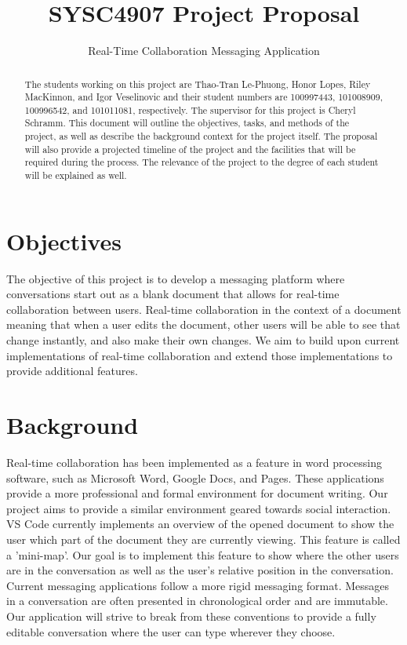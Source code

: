 \documentclass[letterpaper,12pt]{report}
\begin{document}
	\title{SYSC4907 Project Proposal}
	\author{Real-Time Collaboration Messaging Application}
	\date{}
	\maketitle

	\begin{abstract}
		The students working on this project are Thao-Tran Le-Phuong, Honor
		Lopes, Riley MacKinnon, and Igor Veselinovic and their student numbers
		are 100997443, 101008909, 100996542, and 101011081, respectively. The
		supervisor for this project is Cheryl Schramm. This document will
		outline the objectives, tasks, and methods of the project, as well as
		describe the background context for the project itself. The proposal
		will also provide a projected timeline of the project and the
		facilities that will be required during the process. The relevance of
		the project to the degree of each student will be explained as well.
	\end{abstract}

	\tableofcontents

	\pagebreak

	\section*{Objectives}
	\markright{}
	The objective of this project is to develop a messaging platform where
	conversations start out as a blank document that allows for real-time
	collaboration between users. Real-time collaboration in the context of 
	a document meaning that when a user edits the document, other users will 
	be able to see that change instantly, and also make their own changes. 
	We aim to build upon current implementations of real-time collaboration 
	and extend those implementations to provide additional features.

	\section*{Background}
	\markright{}
	Real-time collaboration has been implemented as a feature in word
	processing software, such as Microsoft Word, Google Docs, and Pages. These
	applications provide a more professional and formal environment for
	document writing. Our project aims to provide a similar environment geared
	towards social interaction. VS Code currently implements an overview of the
	opened document to show the user which part of the document they are
	currently viewing. This feature is called a 'mini-map'. Our goal is to
	implement this feature to show where the other users are in the
	conversation as well as the user's relative position in the conversation.
	Current messaging applications follow a more rigid messaging format.
	Messages in a conversation are often presented in chronological order and 
	are immutable. Our application will strive to break from these conventions
	to provide a fully editable conversation where the user can type wherever
	they choose.
\end{document}
